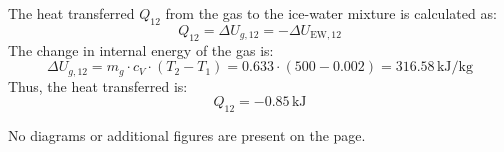The heat transferred \( Q_{12} \) from the gas to the ice-water mixture is calculated as:  
\[
Q_{12} = \Delta U_{g,12} = -\Delta U_{\text{EW},12}
\]  
The change in internal energy of the gas is:  
\[
\Delta U_{g,12} = m_g \cdot c_V \cdot (T_2 - T_1) = 0.633 \cdot (500 - 0.002) = 316.58 \, \text{kJ/kg}
\]  
Thus, the heat transferred is:  
\[
Q_{12} = -0.85 \, \text{kJ}
\]  

No diagrams or additional figures are present on the page.